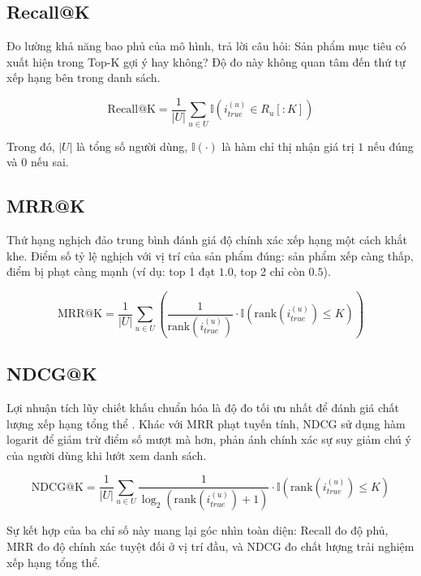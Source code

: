\subsection{Recall@K }
Đo lường khả năng bao phủ của mô hình, trả lời câu hỏi: Sản phẩm mục tiêu có xuất hiện trong Top-K gợi ý hay không? \cite{47} Độ đo này không quan tâm đến thứ tự xếp hạng bên trong danh sách.

\begin{equation}
    \text{Recall@K} = \frac{1}{|U|} \sum_{u \in U} \mathbb{I}(i_{true}^{(u)} \in R_u[:K])
\end{equation}

Trong đó, $|U|$ là tổng số người dùng, $\mathbb{I}(\cdot)$ là hàm chỉ thị nhận giá trị $1$ nếu đúng và $0$ nếu sai.

\subsection{MRR@K}
Thứ hạng nghịch đảo trung bình đánh giá độ chính xác xếp hạng một cách khắt khe\cite{48}. Điểm số tỷ lệ nghịch với vị trí của sản phẩm đúng: sản phẩm xếp càng thấp, điểm bị phạt càng mạnh (ví dụ: top 1 đạt $1.0$, top 2 chỉ còn $0.5$).

\begin{equation}
    \text{MRR@K} = \frac{1}{|U|} \sum_{u \in U} \left( \frac{1}{\text{rank}(i_{true}^{(u)})} \cdot \mathbb{I}(\text{rank}(i_{true}^{(u)}) \le K) \right)
\end{equation}

\subsection{NDCG@K}
Lợi nhuận tích lũy chiết khấu chuẩn hóa là độ đo tối ưu nhất để đánh giá chất lượng xếp hạng tổng thể \cite{47}. Khác với MRR phạt tuyến tính, NDCG sử dụng hàm logarit để giảm trừ điểm số mượt mà hơn, phản ánh chính xác sự suy giảm chú ý của người dùng khi lướt xem danh sách.

\begin{equation}
    \text{NDCG@K} = \frac{1}{|U|} \sum_{u \in U} \frac{1}{\log_2(\text{rank}(i_{true}^{(u)}) + 1)} \cdot \mathbb{I}(\text{rank}(i_{true}^{(u)}) \le K)
\end{equation}

Sự kết hợp của ba chỉ số này mang lại góc nhìn toàn diện: Recall đo độ phủ, MRR đo độ chính xác tuyệt đối ở vị trí đầu, và NDCG đo chất lượng trải nghiệm xếp hạng tổng thể.











